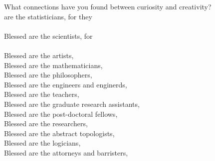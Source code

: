 \bverse What connections have you found between curiosity and creativity? \\
\newpage%
\bversenonum {} are the statisticians, for they\\
\\
\bverse Blessed are the scientists, for\\
\\
\bverse Blessed are the artists, \\

\bverse Blessed are the mathematicians, \\

\bverse Blessed are the philosophers, \\

\bverse Blessed are the engineers and enginerds, \\

\bverse Blessed are the teachers, \\

\bverse Blessed are the graduate research assistants, \\

\bverse Blessed are the post-doctoral fellows, \\

\bverse Blessed are the researchers, \\

\bverse Blessed are the abstract topologists, \\

\bverse Blessed are the logicians, \\

\bverse Blessed are the attorneys and barristers, \\

